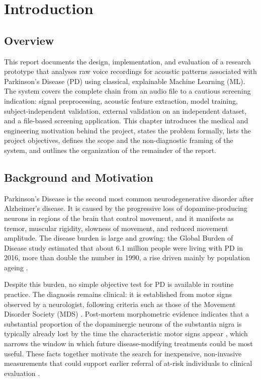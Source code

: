 \chapter{Introduction}

\section{Overview}

This report documents the design, implementation, and evaluation of a
research prototype that analyses raw voice recordings for acoustic
patterns associated with Parkinson's Disease (PD) using classical,
explainable Machine Learning (ML). The system covers the complete chain
from an audio file to a cautious screening indication: signal
preprocessing, acoustic feature extraction, model training,
subject-independent validation, external validation on an independent
dataset, and a file-based screening application. This chapter introduces
the medical and engineering motivation behind the project, states the
problem formally, lists the project objectives, defines the scope and
the non-diagnostic framing of the system, and outlines the organization
of the remainder of the report.

\section{Background and Motivation}

Parkinson's Disease is the second most common neurodegenerative
disorder after Alzheimer's disease. It is caused by the progressive loss
of dopamine-producing neurons in regions of the brain that control
movement, and it manifests as tremor, muscular rigidity, slowness of
movement, and reduced movement amplitude. The disease burden is large
and growing: the Global Burden of Disease study estimated that about 6.1
million people were living with PD in 2016, more than double the number
in 1990, a rise driven mainly by population ageing \cite{gbd2018}.

Despite this burden, no simple objective test for PD is available in
routine practice. The diagnosis remains clinical: it is established from
motor signs observed by a neurologist, following criteria such as those
of the Movement Disorder Society (MDS) \cite{postuma2015}. Post-mortem
morphometric evidence indicates that a substantial proportion of the
dopaminergic neurons of the substantia nigra is typically already lost
by the time the characteristic motor signs appear \cite{fearnley1991},
which narrows the window in which future disease-modifying treatments
could be most useful. These facts together motivate the search for
inexpensive, non-invasive measurements that could support earlier
referral of at-risk individuals to clinical evaluation
\cite{postuma2015,fearnley1991}.

